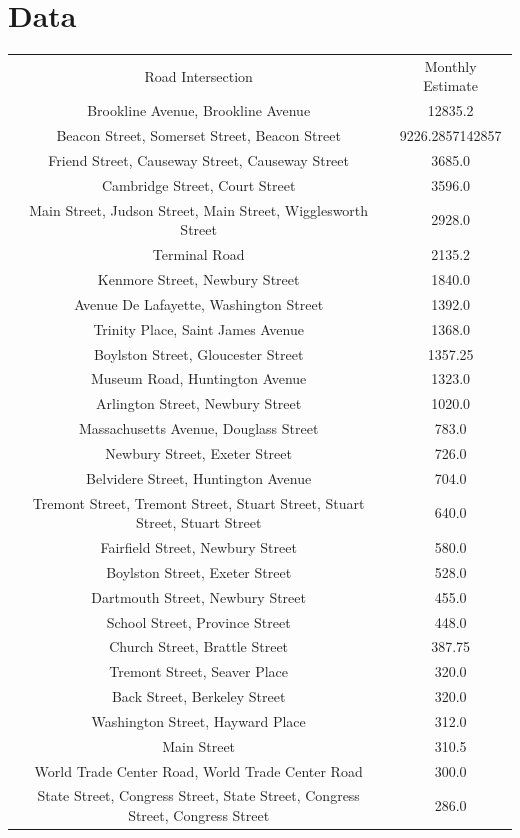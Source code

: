\documentclass[twocolumn,10pt]{asme2ej}
\begin{document}
\section{Data}
\begin{tabular}{c | c |}
Road Intersection & Monthly Estimate \\
Brookline Avenue, Brookline Avenue & 12835.2 \\
Beacon Street, Somerset Street, Beacon Street & 9226.2857142857 \\
Friend Street, Causeway Street, Causeway Street & 3685.0 \\
Cambridge Street, Court Street & 3596.0 \\
Main Street, Judson Street, Main Street, Wigglesworth Street & 2928.0 \\
Terminal Road & 2135.2 \\
Kenmore Street, Newbury Street & 1840.0 \\
Avenue De Lafayette, Washington Street & 1392.0 \\
Trinity Place, Saint James Avenue & 1368.0 \\
Boylston Street, Gloucester Street & 1357.25 \\
Museum Road, Huntington Avenue & 1323.0 \\
Arlington Street, Newbury Street & 1020.0 \\
Massachusetts Avenue, Douglass Street & 783.0 \\
Newbury Street, Exeter Street & 726.0 \\
Belvidere Street, Huntington Avenue & 704.0 \\
Tremont Street, Tremont Street, Stuart Street, Stuart Street, Stuart Street & 640.0 \\
Fairfield Street, Newbury Street & 580.0 \\
Boylston Street, Exeter Street & 528.0 \\
Dartmouth Street, Newbury Street & 455.0 \\
School Street, Province Street & 448.0 \\
Church Street, Brattle Street & 387.75 \\
Tremont Street, Seaver Place & 320.0 \\
Back Street, Berkeley Street & 320.0 \\
Washington Street, Hayward Place & 312.0 \\
Main Street & 310.5 \\
World Trade Center Road, World Trade Center Road & 300.0 \\
State Street, Congress Street, State Street, Congress Street, Congress Street & 286.0 \\

\end{tabular}
\end{document}
